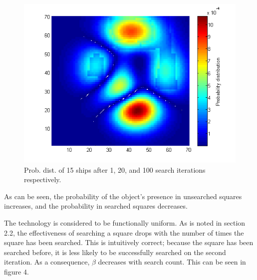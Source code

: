 \documentclass[a4paper]{article}
\begin{document}
\begin{figure}[H]
\begin{center}
\includegraphics[scale=0.35]{../Matlab/Images/ModelSearch100.png}
\caption{Prob. dist. of 15 ships after 1, 20, and 100 search iterations respectively.}
\end{center}\end{figure}

As can be seen, the probability of the object's presence in unsearched squares increases, and the probability in searched squares decreases. 

The technology is considered to be functionally uniform. As is noted in section 2.2, the effectiveness of searching a square drops with the number of times the square has been searched. This is intuitively correct; because the square has been searched before, it is less likely to be successfully searched on the second iteration. As a consequence, $\beta$ decreases with search count. This can be seen in figure 4.
\end{document}
